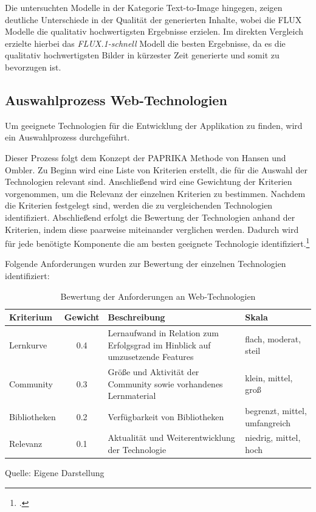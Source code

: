 Die untersuchten Modelle in der Kategorie Text-to-Image hingegen, zeigen deutliche Unterschiede in der Qualität der generierten Inhalte, wobei die FLUX Modelle die qualitativ hochwertigsten Ergebnisse erzielen.
Im direkten Vergleich erzielte hierbei das \textit{FLUX.1-schnell} Modell die besten Ergebnisse, da es die qualitativ hochwertigsten Bilder in kürzester Zeit generierte und somit zu bevorzugen ist.

\subsection{Auswahlprozess Web-Technologien}
Um geeignete Technologien für die Entwicklung der Applikation zu finden, wird ein Auswahlprozess durchgeführt.

Dieser Prozess folgt dem Konzept der \ac{PAPRIKA} Methode von Hansen und Ombler.
Zu Beginn wird eine Liste von Kriterien erstellt, die für die Auswahl der Technologien relevant sind.
Anschließend wird eine Gewichtung der Kriterien vorgenommen, um die Relevanz der einzelnen Kriterien zu bestimmen.
Nachdem die Kriterien festgelegt sind, werden die zu vergleichenden Technologien identifiziert.
Abschließend erfolgt die Bewertung der Technologien anhand der Kriterien, indem diese paarweise miteinander verglichen werden.
Dadurch wird für jede benötigte Komponente die am besten geeignete Technologie identifiziert.\footcite{Paprika2008}

Folgende Anforderungen wurden zur Bewertung der einzelnen Technologien identifiziert:

\begin{table}[htbp]
  \centering
  \begin{tabular}{|p{2cm}|c|p{5cm}|p{4cm}|}
      \hline
      \textbf{Kriterium} & \textbf{Gewicht} & \textbf{Beschreibung} & \textbf{Skala}\\ \hline
      {Lernkurve} & 0.4 & Lernaufwand in Relation zum Erfolgsgrad im Hinblick auf umzusetzende Features & flach, moderat, steil\\ \hline
      {Community} & 0.3 & Größe und Aktivität der Community sowie vorhandenes Lernmaterial & klein, mittel, groß\\ \hline
      {Bibliotheken} & 0.2 & Verfügbarkeit von Bibliotheken & begrenzt, mittel, umfangreich\\ \hline
      {Relevanz} & 0.1 & Aktualität und Weiterentwicklung der Technologie & niedrig, mittel, hoch\\ \hline
  \end{tabular}
  \caption{Bewertung der Anforderungen an Web-Technologien}\label{tab:table}
  \raggedright Quelle: Eigene Darstellung
\end{table}

